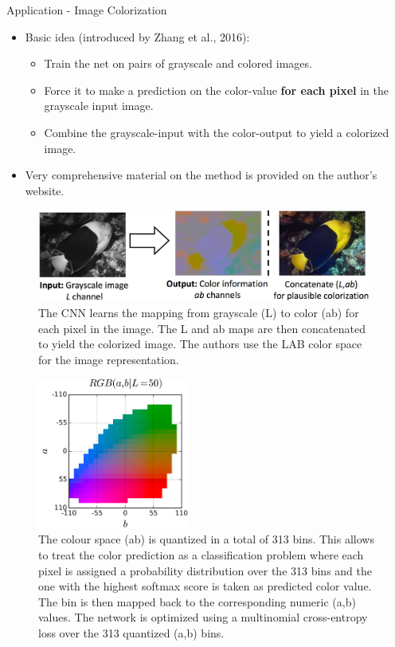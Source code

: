 \begin{vbframe}{Application - Image Colorization}
    \begin{itemize}
        \item Basic idea (introduced by Zhang et al., 2016):
        \begin{itemize}
            \item Train the net on pairs of grayscale and colored images.
            \item Force it to make a prediction on the color-value \textbf{for each pixel} in the grayscale input image.
            \item Combine the grayscale-input with the color-output to yield a colorized image.
        \end{itemize}
        \item Very comprehensive material on the method is provided on the author's website. \href{http://richzhang.github.io/colorization/}{}
            \end{itemize}
            \framebreak
            \begin{figure}
            \centering
            \includegraphics[width=11cm]{figure/fish_lab.png}
            \caption{The CNN learns the mapping from grayscale (L) to color (ab) for each pixel in the image. The L and ab maps are then concatenated to yield the colorized image. The authors use the LAB color space for the image representation.}
            \end{figure}
            \framebreak
            \begin{figure}
            \centering
            \includegraphics[width=5cm]{figure/lab.png}
            \caption{The colour space (ab) is quantized in a total of 313 bins. This allows to treat the color prediction as a classification problem where each pixel is assigned a probability distribution over the 313 bins and the one with the highest softmax score is taken as predicted color value. The bin is then mapped back to the corresponding numeric (a,b) values. The network is optimized using a multinomial cross-entropy loss over the 313 quantized (a,b) bins.}

\end{figure}
\end{vbframe}
